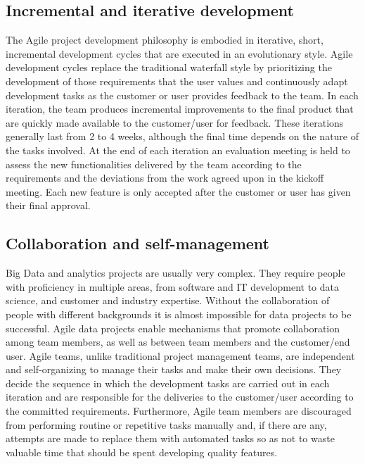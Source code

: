 \documentclass[
  letterpaper,
  DIV=11,
  numbers=noendperiod]{scrreprt}
\begin{document}
\hypertarget{incremental-and-iterative-development}{%
\subsection{Incremental and iterative
development}\label{incremental-and-iterative-development}}

The Agile project development philosophy is embodied in iterative,
short, incremental development cycles that are executed in an
evolutionary style. Agile development cycles replace the traditional
waterfall style by prioritizing the development of those requirements
that the user values and continuously adapt development tasks as the
customer or user provides feedback to the team. In each iteration, the
team produces incremental improvements to the final product that are
quickly made available to the customer/user for feedback. These
iterations generally last from 2 to 4 weeks, although the final time
depends on the nature of the tasks involved. At the end of each
iteration an evaluation meeting is held to assess the new
functionalities delivered by the team according to the requirements and
the deviations from the work agreed upon in the kickoff meeting. Each
new feature is only accepted after the customer or user has given their
final approval.

\hypertarget{collaboration-and-self-management}{%
\subsection{Collaboration and
self-management}\label{collaboration-and-self-management}}

Big Data and analytics projects are usually very complex. They require
people with proficiency in multiple areas, from software and IT
development to data science, and customer and industry expertise.
Without the collaboration of people with different backgrounds it is
almost impossible for data projects to be successful. Agile data
projects enable mechanisms that promote collaboration among team
members, as well as between team members and the customer/end user.
Agile teams, unlike traditional project management teams, are
independent and self-organizing to manage their tasks and make their own
decisions. They decide the sequence in which the development tasks are
carried out in each iteration and are responsible for the deliveries to
the customer/user according to the committed requirements. Furthermore,
Agile team members are discouraged from performing routine or repetitive
tasks manually and, if there are any, attempts are made to replace them
with automated tasks so as not to waste valuable time that should be
spent developing quality features.
\end{document}
